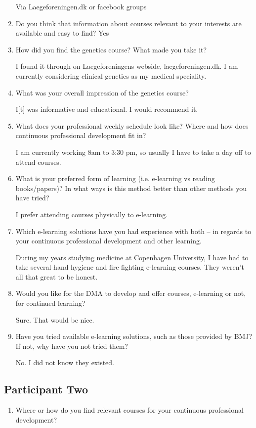 \begin{appendices}
\begin{enumerate}
Via Laegeforeningen.dk or facebook groups

\item Do you think that information about courses relevant to your interests are available and easy to find?
    Yes
\item How did you find the genetics course? What made you take it?

I found it through on Laegeforeningens webside, laegeforeningen.dk. I am currently considering clinical genetics as my medical speciality.

\item What was your overall impression of the genetics course?

    I[t] was informative and educational. I would recommend it.

\item What does your professional weekly schedule look like? Where and how does continuous professional development fit in?

I am currently working 8am to 3:30 pm, so usually I have to take a day off to attend courses.

\item What is your preferred form of learning (i.e. e-learning vs reading books/papers)? In what ways is this method better than other methods you have tried?

I prefer attending courses physically to e-learning.

\item Which e-learning solutions have you had experience with both -- in regards to your continuous professional development and other learning.

During my years studying medicine at Copenhagen University, I have had to take several hand hygiene and fire fighting e-learning courses. They weren't all that great to be honest.

\item Would you like for the DMA to develop and offer courses, e-learning or not, for continued learning?

    Sure. That would be nice.

\item Have you tried available e-learning solutions, such as those provided by BMJ? If not, why have you not tried them?

    No. I did not know they existed.
\end{enumerate}

\subsection{Participant Two}
\begin{enumerate}
    \item Where or how do you find relevant courses for your continuous professional development?


\end{enumerate}
\end{appendices}
